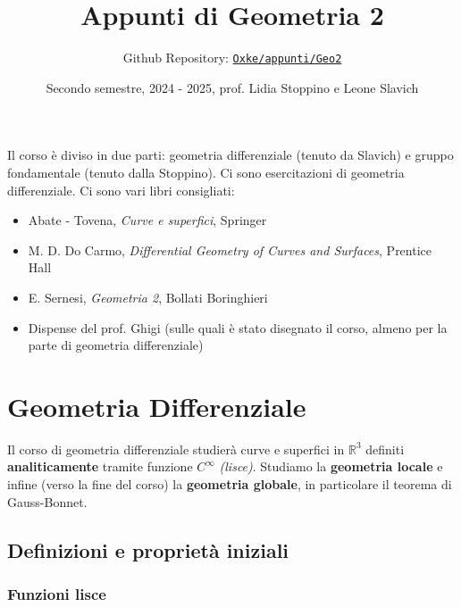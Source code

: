 

\title{Appunti di Geometria 2}
\author{Github Repository:
\href{https://github.com/Oxke/appunti/tree/main/Geo2}{\texttt{Oxke/appunti/Geo2}}}
\date{Secondo semestre, 2024 \-- 2025, prof. Lidia Stoppino e Leone Slavich}



\begin{titlingpage}
\maketitle

\vspace{1cm}
Il corso è diviso in due parti: geometria differenziale (tenuto da Slavich) e
gruppo fondamentale (tenuto dalla Stoppino). Ci sono esercitazioni di geometria
differenziale.
Ci sono vari libri consigliati:
\begin{itemize}[label = --]
    \item Abate \-- Tovena, \emph{Curve e superfici}, Springer
    \item M. D. Do Carmo, \emph{Differential Geometry of Curves and Surfaces},
        Prentice Hall
    \item E. Sernesi, \emph{Geometria 2}, Bollati Boringhieri
    \item Dispense del prof. Ghigi (sulle quali è stato disegnato il corso,
        almeno per la parte di geometria differenziale)
\end{itemize}

\end{titlingpage}

\chapter{Geometria Differenziale}
Il corso di geometria differenziale studierà curve e superfici in
\(\mathbb{R}^3\) definiti \textbf{analiticamente} tramite funzione
\(C^{\infty}\) \emph{(lisce)}. Studiamo la \textbf{geometria locale} e infine
(verso la fine del corso) la \textbf{geometria globale}, in particolare il
teorema di Gauss-Bonnet.

\section{Definizioni e proprietà iniziali}
\subsection{Funzioni lisce}

